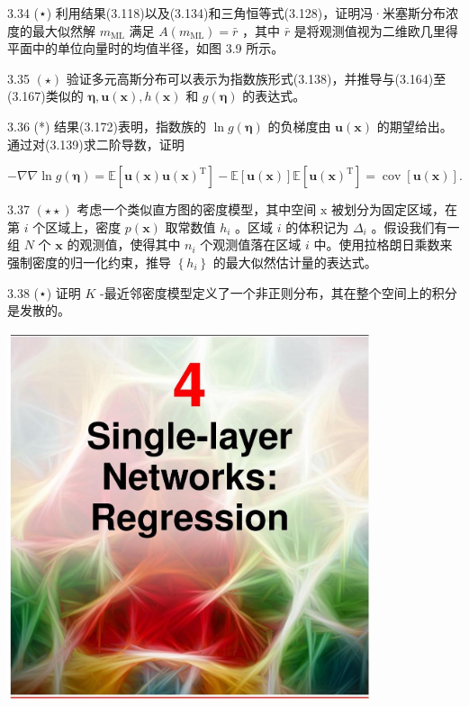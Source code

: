 \documentclass[10pt]{article}
\begin{document}
3.34 (⋆) 利用结果(3.118)以及(3.134)和三角恒等式(3.128)，证明冯·米塞斯分布浓度的最大似然解 \({m}_{\mathrm{{ML}}}\) 满足 \(A\left( {m}_{\mathrm{{ML}}}\right)  = \bar{r}\) ，其中 \(\bar{r}\) 是将观测值视为二维欧几里得平面中的单位向量时的均值半径，如图 3.9 所示。

3.35 \(\left( \star \right)\) 验证多元高斯分布可以表示为指数族形式(3.138)，并推导与(3.164)至(3.167)类似的 \(\mathbf{\eta },\mathbf{u}\left( \mathbf{x}\right) ,h\left( \mathbf{x}\right)\) 和 \(g\left( \mathbf{\eta }\right)\) 的表达式。

3.36 (*) 结果(3.172)表明，指数族的 \(\ln g\left( \mathbf{\eta }\right)\) 的负梯度由 \(\mathbf{u}\left( \mathbf{x}\right)\) 的期望给出。通过对(3.139)求二阶导数，证明

\[
- \nabla \nabla \ln g\left( \mathbf{\eta }\right)  = \mathbb{E}\left\lbrack  {\mathbf{u}\left( \mathbf{x}\right) \mathbf{u}{\left( \mathbf{x}\right) }^{\mathrm{T}}}\right\rbrack   - \mathbb{E}\left\lbrack  {\mathbf{u}\left( \mathbf{x}\right) }\right\rbrack  \mathbb{E}\left\lbrack  {\mathbf{u}{\left( \mathbf{x}\right) }^{\mathrm{T}}}\right\rbrack   = \operatorname{cov}\left\lbrack  {\mathbf{u}\left( \mathbf{x}\right) }\right\rbrack  . \tag{3.218}
\]

3.37 \(\left( {\star  \star  }\right)\) 考虑一个类似直方图的密度模型，其中空间 \(\mathrm{x}\) 被划分为固定区域，在第 \(i\) 个区域上，密度 \(p\left( \mathbf{x}\right)\) 取常数值 \({h}_{i}\) 。区域 \(i\) 的体积记为 \({\Delta }_{i}\) 。假设我们有一组 \(N\) 个 \(\mathbf{x}\) 的观测值，使得其中 \({n}_{i}\) 个观测值落在区域 \(i\) 中。使用拉格朗日乘数来强制密度的归一化约束，推导 \(\left\{  {h}_{i}\right\}\) 的最大似然估计量的表达式。

3.38 (⋆) 证明 \(K\) -最近邻密度模型定义了一个非正则分布，其在整个空间上的积分是发散的。

\begin{center}
\includegraphics[max width=0.8\textwidth]{images/0194e279-9b28-703a-88f4-c3ac21e2010d_130_472_349_1077_1088_0.jpg}
\end{center}
\hspace*{3em} 
\end{document}
